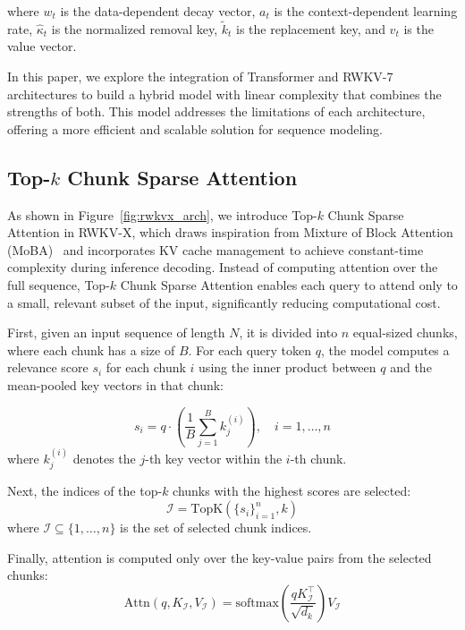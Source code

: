where \(w_t\) is the data-dependent decay vector, \(a_t\) is the context-dependent learning rate, \(\hat{\kappa}_t\) is the normalized removal key, \(\tilde{k}_t\) is the replacement key, and \(v_t\) is the value vector.

In this paper, we explore the integration of Transformer and RWKV-7 architectures to build a hybrid model with linear complexity that combines the strengths of both. This model addresses the limitations of each architecture, offering a more efficient and scalable solution for sequence modeling.

\subsection{Top-\(k\) Chunk Sparse Attention}

As shown in Figure~\ref{fig:rwkvx_arch}, we introduce Top-\(k\) Chunk Sparse Attention in RWKV-X, which draws inspiration from Mixture of Block Attention (MoBA)~\cite{lu2025mobamixtureblockattention} and incorporates KV cache management to achieve constant-time complexity during inference decoding.
Instead of computing attention over the full sequence, Top-\(k\) Chunk Sparse Attention enables each query to attend only to a small, relevant subset of the input, significantly reducing computational cost.

First, given an input sequence of length $N$, it is divided into $n$ equal-sized chunks, where each chunk has a size of $B$.
For each query token $q$, the model computes a relevance score $s_i$ for each chunk $i$ using the inner product between $q$ and the mean-pooled key vectors in that chunk:

\begin{equation}
s_i = q \cdot \left( \frac{1}{B} \sum_{j=1}^{B} k_j^{(i)} \right), \quad i = 1, \dots, n
\end{equation}
where \( k_j^{(i)} \) denotes the \( j \)-th key vector within the \( i \)-th chunk.

Next, the indices of the top-\( k \) chunks with the highest scores are selected:
\begin{equation}
\mathcal{I} = \text{TopK}\left( \{ s_i \}_{i=1}^{n}, k \right)
\end{equation}
where \( \mathcal{I} \subseteq \{1, \dots, n\} \) is the set of selected chunk indices.

Finally, attention is computed only over the key-value pairs from the selected chunks:
\begin{equation}
\text{Attn}(q, K_{\mathcal{I}}, V_{\mathcal{I}}) = \text{softmax}\left( \frac{q K_{\mathcal{I}}^\top}{\sqrt{d_k}} \right) V_{\mathcal{I}}
\end{equation}

